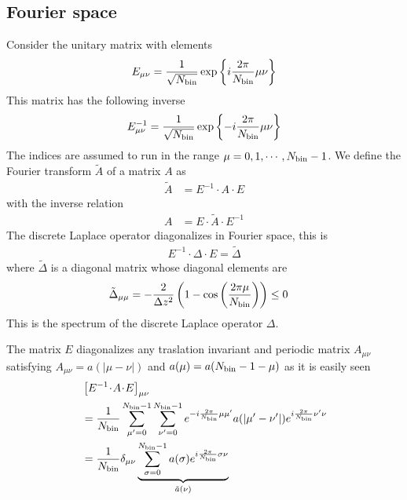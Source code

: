 \documentclass[b5paper,openright,11pt]{book}
\newcommand{\esc}{\!\cdot\!}
\begin{document}
\subsection{Fourier space}
Consider the unitary matrix with elements
\begin{align}
E_{\mu\nu}=\frac{1}{\sqrt{N_{\rm bin}}}\exp\left\{i\frac{2\pi}{N_{\rm bin}}\mu\nu\right\}
\end{align} 
This matrix has the following inverse
\begin{align}
E^{-1}_{\mu\nu}=\frac{1}{\sqrt{N_{\rm bin}}}\exp\left\{-i\frac{2\pi}{N_{\rm bin}}\mu\nu\right\}
\end{align} 
The indices  are assumed  to run  in the  range $\mu=0,1,\cdots,N_{\rm
  bin}-1$.  
We define the Fourier transform $\tilde{A}$ of a matrix $A$ as
\begin{align}
    \tilde{A}&=E^{-1}\esc A\esc{E}
 \end{align}
with the inverse relation 
 \begin{align}
     A&=E\esc  \tilde{A}\esc{E}^{-1}
\label{FT}
\end{align}
The discrete Laplace operator diagonalizes in Fourier space, this is
\begin{align}
  E^{-1}  \esc {\Delta} \esc E= \tilde{\Delta}
\label{EDE}
\end{align}
where $\tilde{\Delta}$ is a diagonal matrix whose diagonal  elements are
\begin{align}
\tilde{\Delta}_{\mu\mu}&=-\frac{2}{\Delta z^2}
\left(1-\cos\left( \frac{2\pi \mu}{N_{\rm bin}}\right)\right)\le0  
\label{Dmumu}
\end{align}
This is the  spectrum of the discrete Laplace  operator $\Delta$. 


The matrix $E$ diagonalizes any traslation invariant and periodic
matrix    $A_{\mu\nu}$    satisfying    $A_{\mu\nu}=a(|\mu-\nu|)$    and
$a(\mu)=a(N_{\rm bin}-1-\mu)$ as it is easily seen
\begin{align}
&\left[  E^{-1}\esc A\esc E\right]_{\mu\nu}
\nonumber\\
&=
\frac{1}{N_{\rm bin}}\sum_{\mu'=0}^{N_{\rm bin}-1}\sum_{\nu'=0}^{N_{\rm bin}-1} e^{-i\frac{2\pi}{N_{\rm bin}}\mu\mu'}a(|\mu'-\nu'|)
e^{i\frac{2\pi}{N_{\rm bin}}\nu'\nu}
 \nonumber\\
&=\frac{1}{N_{\rm bin}}\delta_{\mu\nu}\underbrace{\sum_{\sigma=0}^{N_{\rm bin}-1}a(\sigma)e^{i\frac{2\pi}{N_{\rm bin}}\sigma\nu}}_{\tilde{a}(\nu)}
\end{align}
\end{document}
